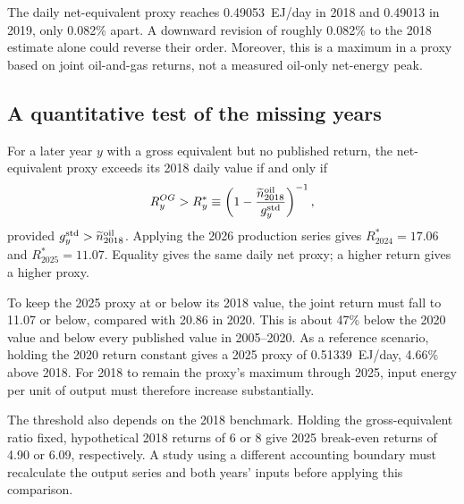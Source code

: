 \documentclass[reprint,aps,pra,longbibliography,floatfix]{revtex4-2}
\begin{document}
The daily net-equivalent proxy reaches 0.49053~EJ/day in 2018 and 0.49013 in 2019, only 0.082\% apart. A downward revision of roughly 0.082\% to the 2018 estimate alone could reverse their order. Moreover, this is a maximum in a proxy based on joint oil-and-gas returns, not a measured oil-only net-energy peak.

\subsection{A quantitative test of the missing years}
For a later year $y$ with a gross equivalent but no published return, the net-equivalent proxy exceeds its 2018 daily value if and only if
\begin{equation}
 R_y^{OG}>R_y^*\equiv
 \left(1-\frac{\widetilde n_{2018}^{\rm oil}}{g_y^{\rm std}}\right)^{-1},
 \label{eq:threshold}
\end{equation}
provided $g_y^{\rm std}>\widetilde n_{2018}^{\rm oil}$. Applying the 2026 production series gives $R_{2024}^*=17.06$ and $R_{2025}^*=11.07$. Equality gives the same daily net proxy; a higher return gives a higher proxy.

To keep the 2025 proxy at or below its 2018 value, the joint return must fall to 11.07 or below, compared with 20.86 in 2020. This is about 47\% below the 2020 value and below every published value in 2005--2020. As a reference scenario, holding the 2020 return constant gives a 2025 proxy of 0.51339~EJ/day, 4.66\% above 2018. For 2018 to remain the proxy's maximum through 2025, input energy per unit of output must therefore increase substantially.

The threshold also depends on the 2018 benchmark. Holding the gross-equivalent ratio fixed, hypothetical 2018 returns of 6 or 8 give 2025 break-even returns of 4.90 or 6.09, respectively. A study using a different accounting boundary must recalculate the output series and both years' inputs before applying this comparison.
\end{document}
